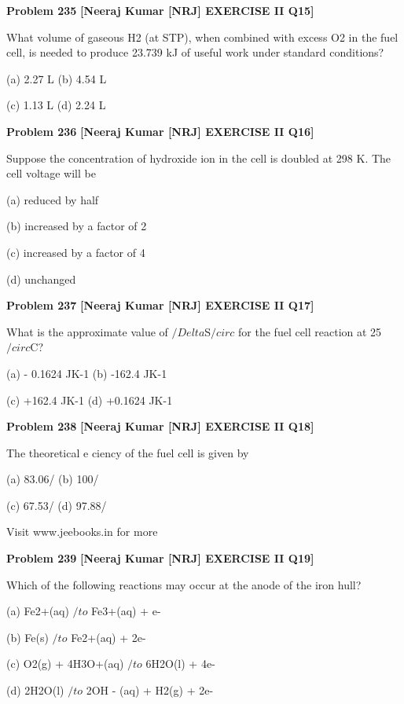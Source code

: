 \begin{problembox}
\textbf{Problem 235} \hfill \textbf{[Neeraj Kumar [NRJ] EXERCISE II Q15]}
\label{q:ext-nrj_all_questions-235}

What volume of gaseous H2 (at STP), when 
combined with excess O2 in the fuel cell, is needed 
to produce 23.739 kJ of useful work under 
standard conditions?
 
 (a) 2.27 L 
(b) 4.54 L
 
 (c) 1.13 L 
(d) 2.24 L
\end{problembox}

\begin{problembox}
\textbf{Problem 236} \hfill \textbf{[Neeraj Kumar [NRJ] EXERCISE II Q16]}
\label{q:ext-nrj_all_questions-236}

Suppose the concentration of hydroxide ion in the 
cell is doubled at 298 K. The cell voltage will be
 
 (a) reduced by half
 
 (b) increased by a factor of 2
 
 (c) increased by a factor of 4
 
 (d) unchanged
\end{problembox}

\begin{problembox}
\textbf{Problem 237} \hfill \textbf{[Neeraj Kumar [NRJ] EXERCISE II Q17]}
\label{q:ext-nrj_all_questions-237}

What is the approximate value of $/Delta$S$/circ$ for the fuel 
cell reaction at 25$/circ$C?
 
 (a) - 0.1624 JK-1 
(b) -162.4 JK-1
 
 (c) +162.4 JK-1 
(d) +0.1624 JK-1
\end{problembox}

\begin{problembox}
\textbf{Problem 238} \hfill \textbf{[Neeraj Kumar [NRJ] EXERCISE II Q18]}
\label{q:ext-nrj_all_questions-238}

The theoretical e   ciency of the fuel cell is given by
 
 (a) 83.06/%
(b) 100/%
 
 (c) 67.53/%
(d) 97.88/%
 
 
Visit www.jeebooks.in for more
\end{problembox}

\begin{problembox}
\textbf{Problem 239} \hfill \textbf{[Neeraj Kumar [NRJ] EXERCISE II Q19]}
\label{q:ext-nrj_all_questions-239}

Which of the following reactions may occur at the 
anode of the iron hull?
 
 (a) Fe2+(aq) $/to$ Fe3+(aq) + e-
 
 (b) Fe(s) $/to$ Fe2+(aq) + 2e-
 
 (c) O2(g) + 4H3O+(aq) $/to$ 6H2O(l) + 4e-
 
 (d) 2H2O(l) $/to$ 2OH - (aq) + H2(g) + 2e-
\end{problembox}

